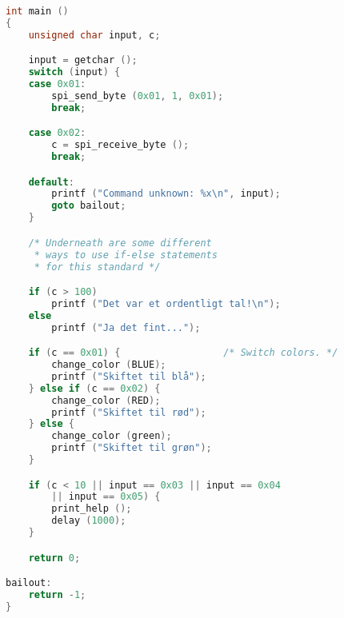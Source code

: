 \documentclass[article, 10pt]{memoir}
\begin{document}
\begin{landscape}
\begin{multicols}{2}
\begin{lstlisting}[language=c]
int main ()
{
    unsigned char input, c;

    input = getchar ();
    switch (input) {
    case 0x01:
        spi_send_byte (0x01, 1, 0x01);
        break;

    case 0x02:
        c = spi_receive_byte ();
        break;

    default:
        printf ("Command unknown: %x\n", input);
        goto bailout;
    }

    /* Underneath are some different 
     * ways to use if-else statements
     * for this standard */

    if (c > 100)
        printf ("Det var et ordentligt tal!\n");
    else
        printf ("Ja det fint...");

    if (c == 0x01) {                  /* Switch colors. */
        change_color (BLUE);
        printf ("Skiftet til blå");
    } else if (c == 0x02) {
        change_color (RED);
        printf ("Skiftet til rød");
    } else {
        change_color (green);
        printf ("Skiftet til grøn");
    }

    if (c < 10 || input == 0x03 || input == 0x04
        || input == 0x05) {
        print_help ();
        delay (1000);
    }

    return 0;

bailout:
    return -1;
}
\end{lstlisting}
\end{multicols}
\end{landscape}
\end{document}
